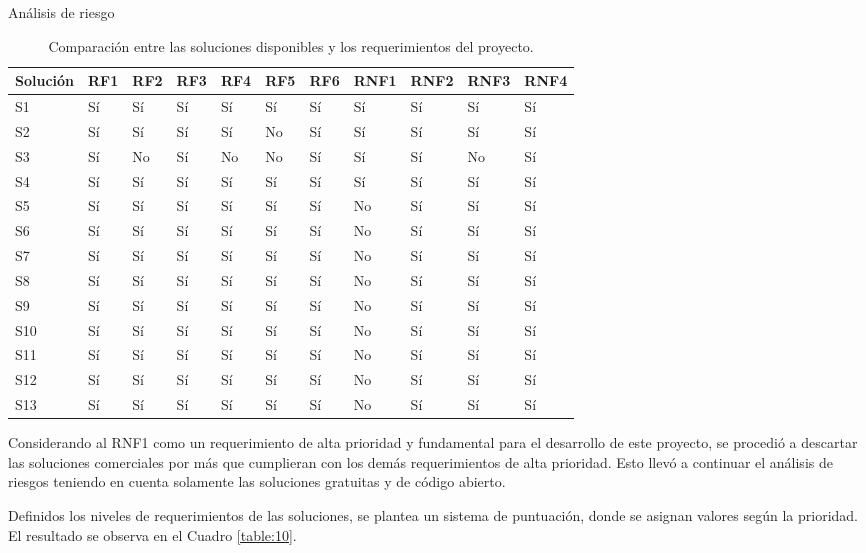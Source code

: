 \begin{section}{Análisis de riesgo}
\begin{table}[H]
\begin{tabular}{|m{4em}|m{2em}|m{2em}|m{2em}|m{2em}|m{2em}|m{2em}|m{3em}|m{3em}|m{3em}|m{3em}|}
            \hline 
                Solución & RF1& RF2& RF3& RF4& RF5& RF6& RNF1& RNF2& RNF3& RNF4 \\ 
            \hline
                S1 & Sí & Sí & Sí & Sí & Sí & Sí & Sí & Sí & Sí & Sí \\ 
            \hline
                S2  & Sí & Sí & Sí & Sí & No & Sí & Sí & Sí & Sí & Sí   \\ 
            \hline
                S3 & Sí & No & Sí & No & No & Sí & Sí & Sí & No & Sí   \\
            \hline
                S4 & Sí & Sí & Sí & Sí & Sí & Sí & Sí & Sí & Sí & Sí  \\
            \hline
                S5 & Sí & Sí & Sí & Sí & Sí & Sí & No & Sí & Sí & Sí  \\
            \hline
                S6 & Sí & Sí & Sí & Sí & Sí & Sí & No & Sí & Sí & Sí \\
            \hline
                S7 & Sí & Sí & Sí & Sí & Sí & Sí & No & Sí & Sí & Sí \\
            \hline
                S8 & Sí & Sí & Sí & Sí & Sí & Sí & No & Sí & Sí & Sí \\
            \hline
                S9 & Sí & Sí & Sí & Sí & Sí & Sí & No & Sí & Sí & Sí \\
            \hline
                S10 & Sí & Sí & Sí & Sí & Sí & Sí & No & Sí & Sí & Sí \\
            \hline
                S11 & Sí & Sí & Sí & Sí & Sí & Sí & No & Sí & Sí & Sí \\
            \hline
                S12 & Sí & Sí & Sí & Sí & Sí & Sí & No & Sí & Sí & Sí \\
            \hline
                S13 & Sí & Sí & Sí & Sí & Sí & Sí & No & Sí & Sí & Sí \\
            \hline %
        \end{tabular}
        \caption{Comparación entre las soluciones disponibles y los requerimientos del proyecto.}
        \label{table:9}
    \end{table} 
     \FloatBarrier
     Considerando al RNF1 como un requerimiento de alta prioridad y fundamental para el desarrollo de este proyecto, se procedió a descartar las soluciones comerciales por más que cumplieran con los demás requerimientos de alta prioridad. Esto llevó a continuar el análisis de riesgos teniendo en cuenta solamente las soluciones gratuitas y de código abierto.\par
    Definidos los niveles de requerimientos de las soluciones, se plantea un sistema de puntuación, donde se asignan valores según la prioridad. El resultado se observa en el Cuadro \ref{table:10}.
    \begin{table}[H]
        \centering
        \begin{tabular}{|m{16em}|m{7em}|}
        

\end{tabular}
\end{table}
\end{section}
